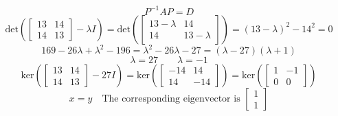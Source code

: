 \documentclass[hidelinks]{article}
\begin{document}
\[
	P^{-1}AP = D
\]
\[
	\text{det}(\begin{bmatrix} 13 & 14 \\ 14 & 13 \end{bmatrix} - \lambda I) = \text{det}(\begin{bmatrix} 13 - \lambda & 14 \\ 14 & 13 - \lambda \end{bmatrix}) = (13 - \lambda)^2 - 14^2 = 0  
\]
\[
	169 - 26\lambda + \lambda^2 - 196 = \lambda^2 - 26\lambda - 27 = (\lambda - 27)(\lambda + 1)
\]
\[
	\lambda = 27 \quad \quad \lambda = -1
\]
\[
	\text{ker}(\begin{bmatrix} 13 & 14 \\ 14 & 13 \end{bmatrix} - 27 I) = \text{ker}(\begin{bmatrix} -14 & 14 \\ 14 & -14 \end{bmatrix})
= \text{ker}(\begin{bmatrix} 1 & -1 \\ 0 & 0 \end{bmatrix}) 
\]
\[
	x = y \quad \text{The corresponding eigenvector is }\begin{bmatrix} 1 \\ 1 \end{bmatrix}
\]
\end{document}
